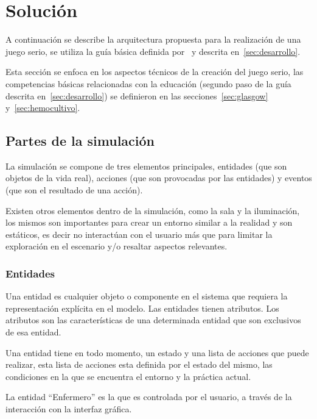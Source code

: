 
\section{Solución}
\label{sec:solucion}

A continuación se describe la arquitectura propuesta para la realización de una juego serio, se
utiliza la guía básica definida por~\cite{pereira2009design} y descrita
en~\ref{sec:desarrollo}.

Esta sección se enfoca en los aspectos técnicos de la creación del juego serio,
las competencias básicas relacionadas con la educación (segundo paso de la guía
descrita en~\ref{sec:desarrollo}) se definieron en las
secciones~\ref{sec:glasgow} y~\ref{sec:hemocultivo}.

\subsection{Partes de la simulación}

La simulación se compone de tres elementos principales, entidades (que son
objetos de la vida real), acciones (que son provocadas por las entidades) y
eventos (que son el resultado de una acción). 

Existen otros elementos dentro de la simulación, como la sala y la iluminación,
los mismos son importantes para crear un entorno similar a la realidad y son
estáticos, es decir no interactúan con el usuario más que para limitar la
exploración en el escenario y/o resaltar aspectos relevantes.

\subsubsection{Entidades}

Una entidad es cualquier objeto o componente en el sistema que requiera la representación
explícita en el modelo\cite{banks2000dm}. Las entidades tienen atributos. Los
atributos son las características de una determinada entidad que son exclusivos
de esa entidad.

Una entidad tiene en todo momento, un estado y una lista de acciones que
puede realizar, esta lista de acciones esta definida por el estado del mismo,
las condiciones en la que se encuentra el entorno y la práctica actual.

La entidad \enquote{Enfermero} es la que es controlada por el usuario, a través
de la interacción con la interfaz gráfica.

